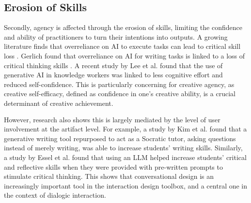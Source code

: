 \subsection{Erosion of Skills}
Secondly, agency is affected through the erosion of skills, limiting the confidence and ability of practitioners to turn their intentions into outputs. A growing literature finds that overreliance on AI to execute tasks can lead to critical skill loss \cite{Heersmink2024-mk, Rafner2021-tm}. Gerlich found that overreliance on AI for writing tasks is linked to a loss of critical thinking skills \cite{Gerlich2025-as}. A recent study by Lee et al. \cite{Lee2025-dw} found that the use of generative AI in knowledge workers was linked to less cognitive effort and reduced self-confidence. This is particularly concerning for creative agency, as creative self-efficacy, defined as confidence in one's creative ability, is a crucial determinant of creative achievement.

However, research also shows this is largely mediated by the level of user involvement at the artifact level. For example, a study by Kim et al. \cite{Kim2023-wt} found that a generative writing tool repurposed to act as a Socratic tutor, asking questions instead of merely writing, was able to increase students' writing skills. Similarly, a study by Essel et al. \cite{Essel2024-qc} found that using an LLM helped increase students' critical and reflective skills when they were provided with pre-written prompts to stimulate critical thinking. This shows that conversational design is an increasingly important tool in the interaction design toolbox, and a central one in the context of dialogic interaction.


